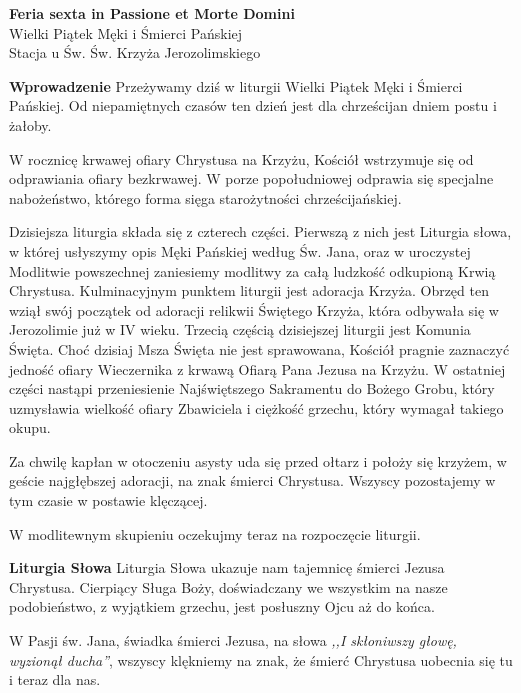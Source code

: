 \documentclass[10pt,oneside,final,notitlepage,a4paper,wide]{mwart}
\begin{document}
%
\begin{center}
	\LARGE{\textbf{Feria sexta in Passione et Morte Domini}}\\ \smallskip
	\small{Wielki Piątek Męki i Śmierci Pańskiej\\ \smallskip Stacja u Św. Św. Krzyża Jerozolimskiego}
\end{center} \vspace{1cm}

	\textbf{Wprowadzenie} Przeżywamy dziś w liturgii Wielki Piątek Męki i Śmierci Pańskiej. Od niepamiętnych czasów ten dzień jest dla chrześcijan dniem postu i żałoby.	
\par W rocznicę krwawej ofiary Chrystusa na Krzyżu, Kościół wstrzymuje się od odprawiania ofiary bez\-krwa\-wej. W porze popołudniowej odprawia się specjalne nabożeństwo, którego forma sięga starożytności chrześcijańskiej.
\par Dzisiejsza liturgia składa się z czterech części. Pierwszą z nich jest Liturgia słowa, w której usłyszymy opis Męki Pańskiej według Św. Jana, oraz w uroczystej Modlitwie powszechnej zaniesiemy modlitwy za całą ludzkość odkupioną Krwią Chrystusa. Kulminacyjnym punktem liturgii jest adoracja Krzyża. Obrzęd ten wziął swój początek od adoracji relikwii Świętego Krzyża, która odbywała się w Jerozolimie już w IV wieku. Trzecią częścią dzisiejszej liturgii jest Komunia Święta. Choć dzisiaj Msza Święta nie jest sprawowana, Kościół pragnie zaznaczyć jedność ofiary Wieczernika z krwawą Ofiarą Pana Jezusa na Krzyżu. W ostatniej części nastąpi przeniesienie Najświętszego Sakramentu do Bożego Grobu, który uzmysławia wielkość ofiary Zbawiciela i ciężkość grzechu, który wymagał takiego okupu.
\par Za chwilę kapłan w otoczeniu asysty uda się przed ołtarz i położy się krzyżem, w geście najgłębszej adoracji, na znak śmierci Chrystusa. Wszyscy pozostajemy w tym czasie w postawie klęczącej.
\par W modlitewnym skupieniu oczekujmy teraz na rozpoczęcie liturgii. \bigskip
	
	\textbf{Liturgia Słowa} Liturgia Słowa ukazuje nam tajemnicę śmierci Jezusa Chrystusa. Cierpiący Sługa Boży, doświadczany we wszystkim na nasze podobieństwo, z wyjątkiem grzechu, jest posłuszny Ojcu aż do końca.
\par W Pasji św. Jana, świadka śmierci Jezusa, na słowa \emph{,,I skłoniwszy głowę, wyzionął ducha''}, wszyscy klękniemy na znak, że śmierć Chrystusa uobecnia się tu i teraz dla nas. \bigskip
	
\end{document}
